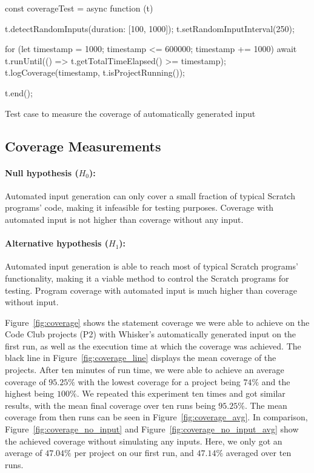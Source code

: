 \begin{listing}[ht]
    \centering

    \begin{minipage}{.9\textwidth}
        \begin{javascriptcode}
            const coverageTest = async function (t) {
                t.detectRandomInputs({duration: [100, 1000]});
                t.setRandomInputInterval(250);

                for (let timestamp = 1000; timestamp <= 600000; timestamp += 1000) {
                    await t.runUntil(() => t.getTotalTimeElapsed() >= timestamp);
                    t.logCoverage(timestamp, t.isProjectRunning());
                }

                t.end();
            }
        \end{javascriptcode}
    \end{minipage}

    \caption{Test case to measure the coverage of automatically generated input}
    \label{lst:coverage_test}
\end{listing}

\subsection{Coverage Measurements}

\paragraph{Null hypothesis ($H_0$):}
Automated input generation can only cover a small fraction of typical Scratch programs' code, making it infeasible for testing purposes.
Coverage with automated input is not higher than coverage without any input.
\paragraph{Alternative hypothesis ($H_1$):}
Automated input generation is able to reach most of typical Scratch programs' functionality, making it a viable method to control the Scratch programs for testing.
Program coverage with automated input is much higher than coverage without input.
\parspace

\noindent Figure~\ref{fig:coverage} shows the statement coverage we were able to achieve on the Code Club projects (P2)
with Whisker's automatically generated input on the first run,
as well as the execution time at which the coverage was achieved.
The black line in Figure~\ref{fig:coverage_line} displays the mean coverage of the projects.
After ten minutes of run time, we were able to achieve an average coverage of $95.25\%$ with the lowest coverage for a project being $74\%$ and the highest being $100\%$.
We repeated this experiment ten times and got similar results, with the mean final coverage over ten runs being $95.25\%$.
The mean coverage from then runs can be seen in Figure~\ref{fig:coverage_avg}.
In comparison, Figure~\ref{fig:coverage_no_input} and Figure~\ref{fig:coverage_no_input_avg} show the achieved coverage without simulating any inputs.
Here, we only got an average of $47.04\%$ per project on our first run, and $47.14\%$ averaged over ten runs.
\parspace

